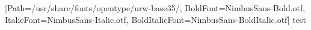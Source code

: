 \documentclass[varwidth]{standalone}
\begin{document}
\setmainfont{NimbusSans-Regular.otf}%
[Path=/usr/share/fonts/opentype/urw-base35/,
 BoldFont=NimbusSans-Bold.otf,
 ItalicFont=NimbusSans-Italic.otf,
 BoldItalicFont=NimbusSans-BoldItalic.otf]
\fontsize{12}{14.4}
\selectfont{}
test
\end{document}
